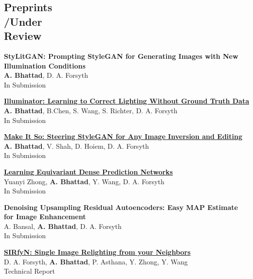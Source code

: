 \documentclass[margin,line]{res}
\begin{document}
\begin{resume}
\section{\sc \large Preprints\\/Under \\Review}
\renewcommand*{\labelenumi}{\theenumi.}
\begin{etaremune}[start=6, leftmargin=15pt]
\item {\bf {StyLitGAN: Prompting StyleGAN for Generating Images with New Illumination Conditions}} \\{{\bf A. Bhattad}, D. A. Forsyth} \\
In Submission
\item {\bf \href{}{Illuminator: Learning to Correct Lighting Without Ground Truth Data}} \\{{\bf A. Bhattad}, B.Chen, S. Wang, S. Richter, D. A. Forsyth}\\
In Submission
\item {\bf \href{}{Make It So: Steering StyleGAN for Any Image Inversion and Editing}} \\{{\bf A. Bhattad}, V. Shah, D. Hoiem, D. A. Forsyth}\\
In Submission
\item {\bf \href{}{Learning Equivariant Dense Prediction Networks}} \\{Yuanyi Zhong, {\bf A. Bhattad}, Y. Wang, D. A. Forsyth}\\
In Submission
\item {\bf Denoising Upsampling Residual Autoencoders: Easy MAP Estimate for Image Enhancement} \\
{A. Bansal, {\bf A. Bhattad}, D. A. Forsyth}\\
In Submission
\item {\bf \href{https://arxiv.org/abs/2112.04497}{SIRfyN: Single Image Relighting from your Neighbors }} \\{D. A. Forsyth, {\bf A. Bhattad}, P. Asthana, Y. Zhong, Y. Wang}\\
Technical Report
\end{etaremune}

\end{resume}
\end{document}
